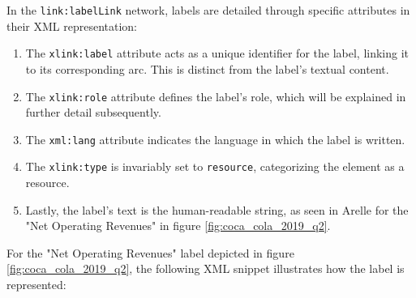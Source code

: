 

In the \texttt{link:labelLink} network, labels are detailed through specific attributes in their XML representation:

\begin{enumerate}
    \item The \texttt{xlink:label} attribute acts as a unique identifier for the label, linking it to its corresponding arc.  
    This is distinct from the label's textual content.  
    \item The \texttt{xlink:role} attribute defines the label's role, which will be explained in further detail subsequently.  
    \item The \texttt{xml:lang} attribute indicates the language in which the label is written.  
    \item The \texttt{xlink:type} is invariably set to \texttt{resource}, categorizing the element as a resource.  
    \item Lastly, the label's text is the human-readable string, as seen in Arelle for the "Net Operating Revenues" in figure \ref{fig:coca_cola_2019_q2}.  
\end{enumerate}

For the "Net Operating Revenues" label depicted in figure \ref{fig:coca_cola_2019_q2}, 
the following XML snippet illustrates how the label is represented:

